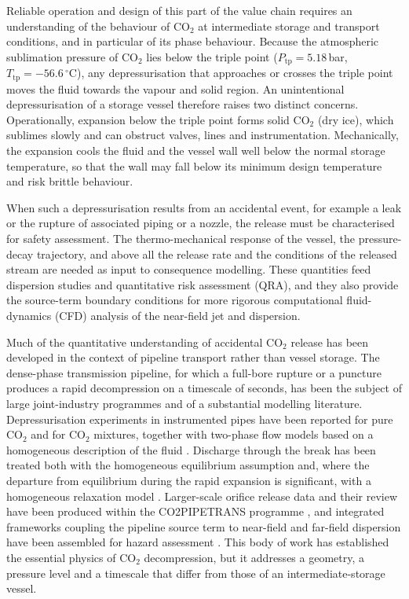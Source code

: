\documentclass[5p,authoryear]{elsarticle}
\begin{document}
Reliable operation and design of this part of the value chain requires an understanding of the
behaviour of CO$_2$ at intermediate storage and transport conditions, and in particular of its
phase behaviour. Because the atmospheric sublimation pressure of CO$_2$ lies below the triple
point ($P_\text{tp} = 5.18$\,bar, $T_\text{tp} = -56.6\,^\circ$C), any depressurisation that
approaches or crosses the triple point moves the fluid towards the vapour and solid region. An
unintentional depressurisation of a storage vessel therefore raises two distinct concerns.
Operationally, expansion below the triple point forms solid CO$_2$ (dry ice), which sublimes
slowly and can obstruct valves, lines and instrumentation. Mechanically, the expansion cools the
fluid and the vessel wall well below the normal storage temperature, so that the wall may fall
below its minimum design temperature and risk brittle behaviour.

When such a depressurisation results from an accidental event, for example a leak or the rupture
of associated piping or a nozzle, the release must be characterised for safety assessment. The
thermo-mechanical response of the vessel, the pressure-decay trajectory, and above all the
release rate and the conditions of the released stream are needed as input to consequence
modelling. These quantities feed dispersion studies and quantitative risk assessment (QRA), and
they also provide the source-term boundary conditions for more rigorous computational
fluid-dynamics (CFD) analysis of the near-field jet and dispersion.

Much of the quantitative understanding of accidental CO$_2$ release has been developed in the
context of pipeline transport rather than vessel storage. The dense-phase transmission pipeline,
for which a full-bore rupture or a puncture produces a rapid decompression on a timescale of
seconds, has been the subject of large joint-industry programmes and of a substantial modelling
literature. Depressurisation experiments in instrumented pipes have been reported for pure CO$_2$
and for CO$_2$ mixtures, together with two-phase flow models based on a homogeneous description of
the fluid \citep{Munkejord2015, Munkejord2021}. Discharge through the break has been treated both
with the homogeneous equilibrium assumption and, where the departure from equilibrium during the
rapid expansion is significant, with a homogeneous relaxation model \citep{Brown2013, Brown2014}.
Larger-scale orifice release data and their review have been produced within the CO2PIPETRANS
programme \citep{Witlox2015}, and integrated frameworks coupling the pipeline source term to
near-field and far-field dispersion have been assembled for hazard assessment \citep{Woolley2014}.
This body of work has established the essential physics of CO$_2$ decompression, but it addresses
a geometry, a pressure level and a timescale that differ from those of an intermediate-storage
vessel.
\end{document}
